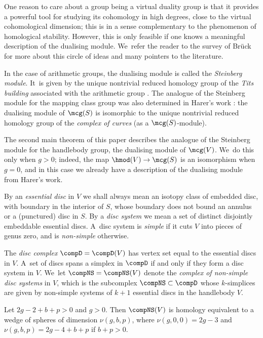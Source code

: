 One reason to care about a group being a virtual duality group is that it provides a powerful tool for studying its cohomology in high degrees, close to the virtual cohomological dimension; this is in a sense complementary to the phenomenon of homological stability. However, this is only feasible if one knows a meaningful description of the dualising module. We~refer the reader to the survey of Brück \cite{bruck-survey} for more about this circle of ideas and many pointers to the literature.

In the case of arithmetic groups, the dualising module is called the \emph{Steinberg module}. It~is given by the unique nontrivial reduced homology group of the \emph{Tits building} associated with the arithmetic group \cite{borelserre}. The analogue of the Steinberg module for the mapping class group was also determined in Harer's work \cite{harer}: the dualising module of $\mcg(S)$ is isomorphic to the unique nontrivial reduced homology group of the \emph{complex of curves} (as a $\mcg(S)$-module).

The second main theorem of this paper describes the analogue of the Steinberg module for the handlebody group, \ie the dualising module of $\mcg(V)$. We~do this only when $g>0$; indeed, the map $\hmod(V)\to\mcg(S)$ is an isomorphism when $g=0$, and in this case we already have a description of the dualising module from Harer's work.

\begin{defn}By an \emph{essential disc} in $V$ we shall always mean an isotopy class of embedded disc, with boundary in the interior of $S$, whose boundary does not bound an annulus or a (punctured) disc in $S$. By a \emph{disc system} we mean a set of distinct disjointly embeddable essential discs. A~disc system is \emph{simple} if it cuts $V$ into pieces of genus zero, and is \emph{non-simple} otherwise.

The \emph{disc complex} $\compD=\compD(V)$ has vertex set equal to the essential discs in $V$. A~set of discs spans a simplex in $\compD$ if and only if they form a disc system in $V$. We~let $\compNS = \compNS(V)$ denote the \emph{complex of non-simple disc systems} in $V$, which is the subcomplex $\compNS \subset \compD$ whose $k$-simplices are given by non-simple systems of $k+1$ essential discs in the handlebody $V$. \end{defn}

\begin{thmA}\label{thm:B}Let $2g -2+ b +p > 0$ and $g>0$. Then $\compNS(V)$ is homology equivalent to a wedge of spheres of dimension $\nu(g,b,p)$, where $\nu(g,0,0) = 2g-3$ and $\nu(g,b,p) = 2g-4+b+p$ if $b+p>0$.
\end{thmA}

